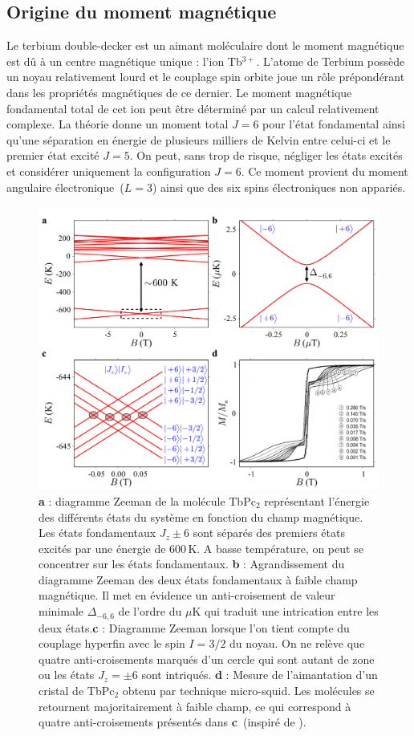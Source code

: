 \subsection{Origine du moment magnétique}
Le terbium double-decker est un aimant moléculaire dont le moment magnétique est d\^u à un centre magnétique unique : l'ion Tb$^{3+}$. L'atome de Terbium possède un noyau relativement lourd et le couplage spin orbite joue un r\^ole prépondérant dans les propriétés magnétiques de ce dernier. Le moment magnétique fondamental total de cet ion peut \^etre déterminé par un calcul relativement complexe. La théorie donne un moment total $J=6$ pour l'état fondamental ainsi qu'une séparation en énergie de plusieurs milliers de Kelvin entre celui-ci et le premier état excité $J=5$. On peut, sans trop de risque, négliger les états excités et considérer uniquement la configuration $J=6$. Ce moment provient du moment angulaire électronique~($L=3$) ainsi que des six spins électroniques non appariés. 

\begin{figure}
\centering \includegraphics[scale=0.45]{Theorie/MagMol/figure4/figure4.pdf} 
\caption{\textbf{a} : diagramme Zeeman de la molécule TbPc$_2$ représentant l'énergie des différents états du système en fonction du champ magnétique. Les états fondamentaux $J_z \pm 6$ sont séparés des premiers états excités par une énergie de $600$\,K. A basse température, on peut se concentrer sur les états fondamentaux. \textbf{b} : Agrandissement du diagramme Zeeman des deux états fondamentaux à faible champ magnétique. Il met en évidence un anti-croisement de valeur minimale $\Delta_{-6,6}$ de l'ordre du $\mu$K qui traduit une intrication entre les deux états.\textbf{c} : Diagramme Zeeman lorsque l'on tient compte du couplage hyperfin avec le spin $I=3/2$ du noyau. On ne relève que quatre anti-croisements marqués d'un cercle qui sont autant de zone ou les états $J_z =\pm6$ sont intriqués. \textbf{d} : Mesure de l'aimantation d'un cristal de TbPc$_2$ obtenu par technique micro-squid. Les molécules se retournent majoritairement à faible champ, ce qui correspond à quatre anti-croisements présentés dans \textbf{c}~(inspiré de \cite{Ishikawa2005}).}
\label{TbPc2Zeeman}
\end{figure}

